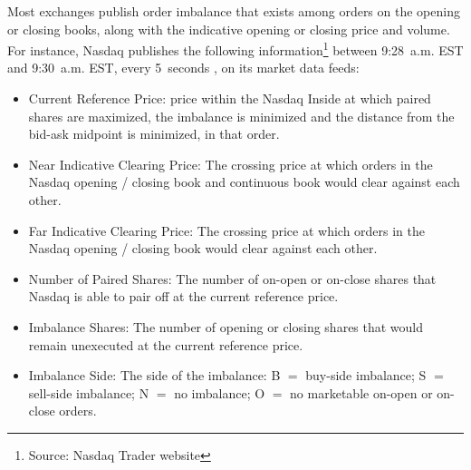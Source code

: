 Most exchanges publish order imbalance that exists among orders on the opening or closing books, along with the indicative opening or closing price and volume. For instance, Nasdaq publishes the following information\footnote{Source: Nasdaq Trader website} between 9:28~a.m. EST and 9:30~a.m. EST,  every 5~seconds , on its market data feeds:
        \begin{itemize}
        \item  Current Reference Price: price within the Nasdaq Inside at which paired shares are maximized, the imbalance is minimized and the distance from the bid-ask midpoint is minimized, in that order.
        \item  Near Indicative Clearing Price: The crossing price at which orders in the Nasdaq opening / closing book and continuous book would clear against each other. 
        \item  Far Indicative Clearing Price: The crossing price at which orders in the Nasdaq opening / closing book would clear against each other. 
        \item  Number of Paired Shares: The number of on-open or on-close shares that Nasdaq is able to pair off at the current reference price. 
        \item  Imbalance Shares: The number of opening or closing shares that would remain unexecuted at the current reference price. 
        \item  Imbalance Side: The side of the imbalance: B $=$ buy-side imbalance; S $=$ sell-side imbalance; N $=$ no imbalance; O $=$ no marketable on-open or on-close orders.
        \end{itemize}


